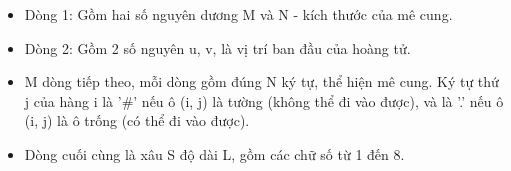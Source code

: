 \begin{itemize}
	\item Dòng 1: Gồm hai số nguyên dương M và N - kích thước của mê cung.
	\item Dòng 2: Gồm 2 số nguyên u, v, là vị trí ban đầu của hoàng tử.
	\item M dòng tiếp theo, mỗi dòng gồm đúng N ký tự, thể hiện mê cung. Ký tự thứ j của hàng i là '\#' nếu ô (i, j) là tường (không thể đi vào được), và là '.' nếu ô (i, j) là ô trống (có thể đi vào được).
	\item Dòng cuối cùng là xâu S độ dài L, gồm các chữ số từ 1 đến 8.
\end{itemize}